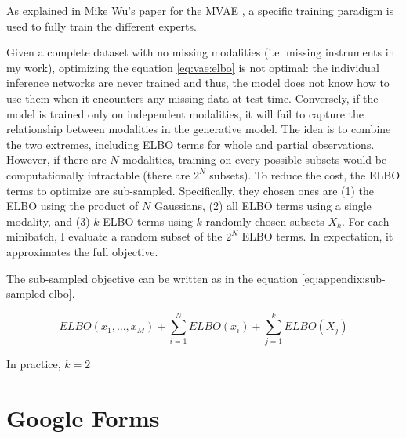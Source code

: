 \documentclass[12pt]{report}
\begin{document}
As explained in Mike Wu's paper for the MVAE \cite{wu_multimodal_2018}, a specific training paradigm is used to fully train the different experts.

Given a complete dataset with no missing modalities (i.e. missing instruments in my work), optimizing the equation \ref{eq:vae:elbo} is not optimal: the individual inference networks are never trained and thus, the model does not know how to use them when it encounters any missing data at test time.
Conversely, if the model is trained only on independent modalities, it will fail to capture the relationship between modalities in the generative model.
The idea is to combine the two extremes, including ELBO terms for whole and partial observations.
However, if there are $N$ modalities, training on every possible subsets would be computationally intractable (there are $2^{N}$ subsets).
To reduce the cost, the ELBO terms to optimize are sub-sampled.
Specifically, they chosen ones are (1) the ELBO using the product of $N$ Gaussians, (2) all ELBO terms using a single modality, and (3) $k$ ELBO terms using $k$ randomly chosen subsets $X_k$.
For each minibatch, I evaluate a random subset of the $2^{N}$ ELBO terms.
In expectation, it approximates the full objective.

The sub-sampled objective can be written as in the equation \ref{eq:appendix:sub-sampled-elbo}.

\begin{equation}
    ELBO(x_1, \dots, x_M) + \sum_{i=1}^{N} ELBO(x_i) + \sum_{j=1}^{k} ELBO(X_j)
    \label{eq:appendix:sub-sampled-elbo}
\end{equation}

In practice, $k = 2$

\section{Google Forms}
\label{appendix:google-forms}
\end{document}
